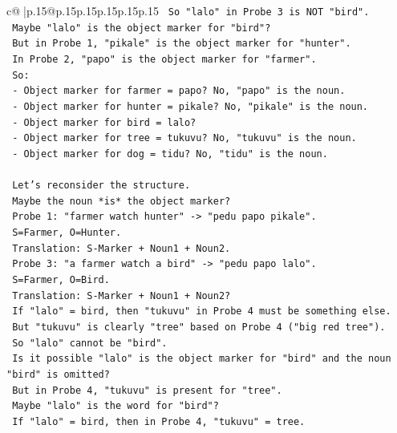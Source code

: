 \documentclass{article}
\begin{document}
{\begin{supertabular}{c@{$\;$}|p{.15\linewidth}@{}p{.15\linewidth}p{.15\linewidth}p{.15\linewidth}p{.15\linewidth}p{.15\linewidth}}
{{{\texttt{    So "lalo" in Probe 3 is NOT "bird".} \\
\texttt{    Maybe "lalo" is the object marker for "bird"?} \\
\texttt{    But in Probe 1, "pikale" is the object marker for "hunter".} \\
\texttt{    In Probe 2, "papo" is the object marker for "farmer".} \\
\texttt{    So:} \\
\texttt{    {-} Object marker for farmer = papo? No, "papo" is the noun.} \\
\texttt{    {-} Object marker for hunter = pikale? No, "pikale" is the noun.} \\
\texttt{    {-} Object marker for bird = lalo?} \\
\texttt{    {-} Object marker for tree = tukuvu? No, "tukuvu" is the noun.} \\
\texttt{    {-} Object marker for dog = tidu? No, "tidu" is the noun.} \\
\\ 
\texttt{    Let's reconsider the structure.} \\
\texttt{    Maybe the noun *is* the object marker?} \\
\texttt{    Probe 1: "farmer watch hunter" {-}> "pedu papo pikale".} \\
\texttt{    S=Farmer, O=Hunter.} \\
\texttt{    Translation: S{-}Marker + Noun1 + Noun2.} \\
\texttt{    Probe 3: "a farmer watch a bird" {-}> "pedu papo lalo".} \\
\texttt{    S=Farmer, O=Bird.} \\
\texttt{    Translation: S{-}Marker + Noun1 + Noun2?} \\
\texttt{    If "lalo" = bird, then "tukuvu" in Probe 4 must be something else.} \\
\texttt{    But "tukuvu" is clearly "tree" based on Probe 4 ("big red tree").} \\
\texttt{    So "lalo" cannot be "bird".} \\
\texttt{    Is it possible "lalo" is the object marker for "bird" and the noun "bird" is omitted?} \\
\texttt{    But in Probe 4, "tukuvu" is present for "tree".} \\
\texttt{    Maybe "lalo" is the word for "bird"?} \\
\texttt{    If "lalo" = bird, then in Probe 4, "tukuvu" = tree.} \\
}}}
\end{supertabular}}
\end{document}
